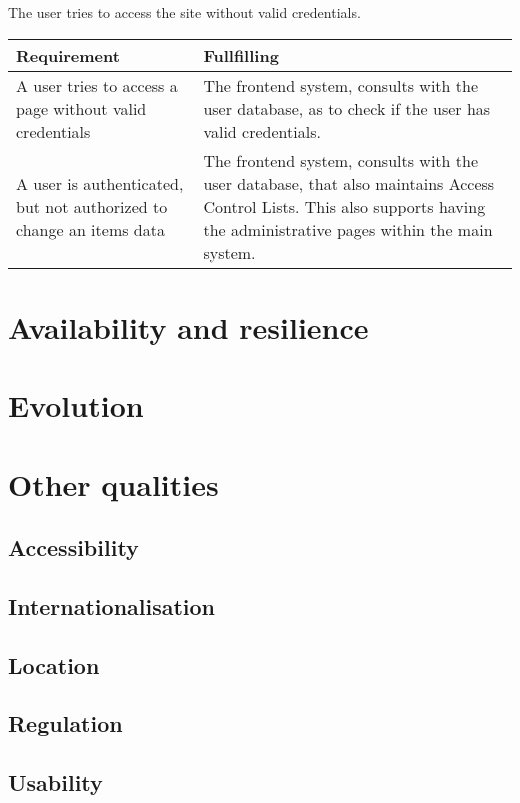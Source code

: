 The user tries to access the site without valid credentials.

\begin{table}[ht]
\centering
\begin{tabular}{p{5cm} | p{7cm}}
Requirement & Fullfilling \\ \hline
A user tries to access a page without valid credentials &
    The frontend system, consults with the user database, as to check if the
    user has valid credentials. \\ \hline
A user is authenticated, but not authorized to change an items data &
    The frontend system, consults with the user database, that also maintains
    Access Control Lists. This also supports having the administrative pages
    within the main system. \\
\end{tabular}
\end{table}

\section{Availability and resilience}
\label{sec:avail-resil}



\section{Evolution}
\label{sec:evolution}


\section{Other qualities}
\label{sec:other-qualities}

\subsection{Accessibility}
\label{sec:accessibility}


\subsection{Internationalisation}
\label{sec:internationalisation}


\subsection{Location}
\label{sec:location}


\subsection{Regulation}
\label{sec:regulation}


\subsection{Usability}
\label{sec:usability}



